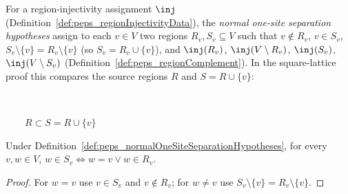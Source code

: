 \begin{definition}%
    \label{def:peps_normalOneSiteSeparationHypotheses}
    \leanok
    For a region-injectivity assignment $\inj$
    (Definition~\ref{def:peps_regionInjectivityData}), the \emph{normal one-site
        separation hypotheses} assign to each $v\in V$ two regions
    $R_v,S_v\subseteq V$ such that $v\notin R_v$, $v\in S_v$,
    $S_v\setminus\{v\}=R_v\setminus\{v\}$ (so $S_v=R_v\cup\{v\}$), and
    $\inj(R_v)$, $\inj(V\setminus R_v)$, $\inj(S_v)$, $\inj(V\setminus S_v)$
    (Definition~\ref{def:peps_regionComplement}).
    In the square-lattice proof this compares the source regions $R$ and
    $S=R\cup\{v\}$:
    \begin{tenkzequation}
        \tenkzkernel
        \begin{tenkz}[rows={ket,ket,ket,ket,ket}, cols=5,
                west=open, east=open, north=open, south=open]
        \end{tenkz}
        $\qquad$
        \begin{tenkz}[rows={ket,ket,ket,ket,ket}, cols=5,
                west=open, east=open, north=open, south=open]
        \end{tenkz}
        $\qquad R\subset S=R\cup\{v\}$
    \end{tenkzequation}
\end{definition}

\begin{lemma}%
    \label{thm:peps_normalOneSiteSeparation_mem_withSite_iff}
    \leanok
    Under Definition~\ref{def:peps_normalOneSiteSeparationHypotheses}, for every
    $v,w\in V$, $w\in S_v\Longleftrightarrow w=v\lor w\in R_v$.
\end{lemma}
\begin{proof}\leanok
    For $w=v$ use $v\in S_v$ and $v\notin R_v$; for $w\ne v$ use
    $S_v\setminus\{v\}=R_v\setminus\{v\}$.
\end{proof}

